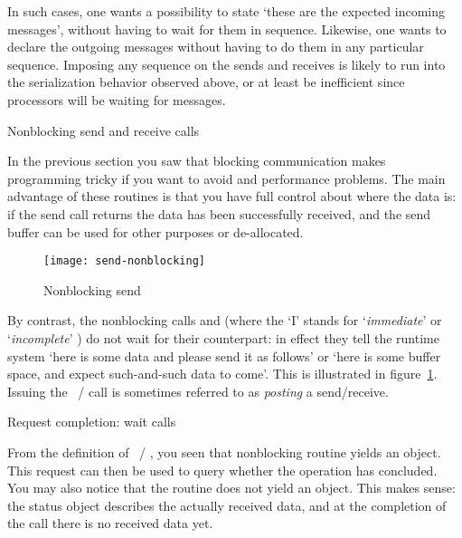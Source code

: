 In such cases, one wants a possibility to state `these are the expected incoming
messages', without having to wait for them in sequence. Likewise, one wants to declare
the outgoing messages without having to do them in any particular sequence.
Imposing any sequence on the sends and receives is likely to run into the serialization
behavior observed above, or at least be inefficient since processors will be
waiting for messages.

 {Nonblocking send and receive calls}
\label{sec:nonblocking}

In the previous section you saw that blocking communication makes
programming tricky if you want to avoid  and performance
problems. The main advantage of these routines is that you have full
control about where the data is: if the send call returns
the data has been successfully received, and the send buffer can be used for
other purposes or de-allocated.  

\begin{figure}[ht]
  \texttt{[image: send-nonblocking]}
  \caption{Nonblocking send}
  \label{fig:send-nonblocking}
\end{figure}

By contrast, the nonblocking calls
 and 
(where the `I' stands for
`\emph{immediate}'
or
`\emph{incomplete}'
)
do not wait for their counterpart: in effect
they tell the runtime system `here is some data and please send it as
follows' or `here is some buffer space, and expect such-and-such data
to come'.  This is illustrated in figure~\ref{fig:send-nonblocking}.
%
%
Issuing the ~/ 
call is sometimes referred to as
\emph{posting}
a send/receive.

 {Request completion: wait calls}
\label{sec:waittest}

From the definition of ~/
, you seen that nonblocking routine yields
an  object. This request can then be used to
query whether the operation has concluded. You may also notice that
the  routine does not yield an
 object.  This makes sense: the status object
describes the actually received data, and at the completion of the
 call there is no received data yet.

